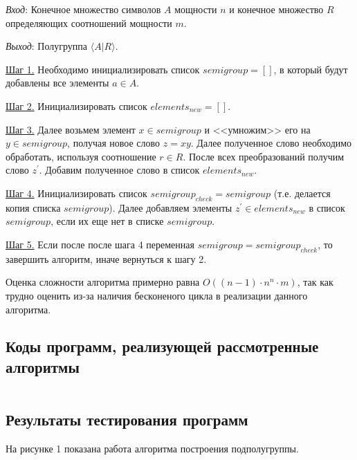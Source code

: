 \documentclass[bachelor, och, labwork]{shiza}
\begin{document}
      \textit{Вход}: Конечное множество символов $A$ мощности $n$ и конечное множество $R$ определяющих соотношений мощности $m$.

      \textit{Выход}: Полугруппа $\langle A | R \rangle$.

      \underline{Шаг 1.} Необходимо инициализировать список $semigroup = []$, в который будут добавлены все элементы $a \in A$.
      
      \underline{Шаг 2.} Инициализировать список $elements_{new} = []$.

      \underline{Шаг 3.} Далее возьмем элемент $x \in semigroup$ и <<умножим>> его на $y \in semigroup$, получая новое слово
      $z = xy$. Далее полученное слово необходимо обработать, используя соотношение $r \in R$. После всех преобразований получим слово $z^{'}$.
      Добавим полученное слово в список $elements_{new}$.

      \underline{Шаг 4.} Инициализировать список $semigroup_{check} = semigroup$ (т.е. делается копия списка $semigroup$). Далее добавляем
      элементы $z^{'} \in elements_{new}$ в список $semigroup$, если их еще нет в списке $semigroup$. 

      \underline{Шаг 5.} Если после после шага 4 переменная $semigroup = semigroup_{check}$, то завершить алгоритм, иначе вернуться к шагу 2.

      Оценка сложности алгоритма примерно равна $O((n - 1) \cdot n^n \cdot m)$, так как трудно оценить из-за наличия бесконеного цикла в реализации
      данного алгоритма.

      \subsection{Коды программ, реализующей рассмотренные алгоритмы}

        \inputminted[fontsize=\small]{python}{code/aua-lab5.py}

        \newpage
      
      \subsection{Результаты тестирования программ}
      
      На рисунке 1 показана работа алгоритма построения подполугруппы.

\end{document}
